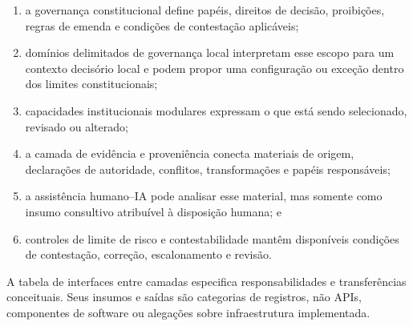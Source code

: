 \documentclass[11pt]{article}
\begin{document}
\begin{enumerate}[leftmargin=*]
\item a governança constitucional define papéis, direitos de decisão,
proibições, regras de emenda e condições de contestação aplicáveis;
\item domínios delimitados de governança local interpretam esse escopo para um
contexto decisório local e podem propor uma configuração ou exceção dentro dos
limites constitucionais;
\item capacidades institucionais modulares expressam o que está sendo
selecionado, revisado ou alterado;
\item a camada de evidência e proveniência conecta materiais de origem,
declarações de autoridade, conflitos, transformações e papéis responsáveis;
\item a assistência humano--IA pode analisar esse material, mas somente como
insumo consultivo atribuível à disposição humana; e
\item controles de limite de risco e contestabilidade mantêm disponíveis
condições de contestação, correção, escalonamento e revisão.
\end{enumerate}

A tabela de interfaces entre camadas especifica responsabilidades e
transferências conceituais. Seus insumos e saídas são categorias de registros,
não APIs, componentes de software ou alegações sobre infraestrutura
implementada.
\end{document}
